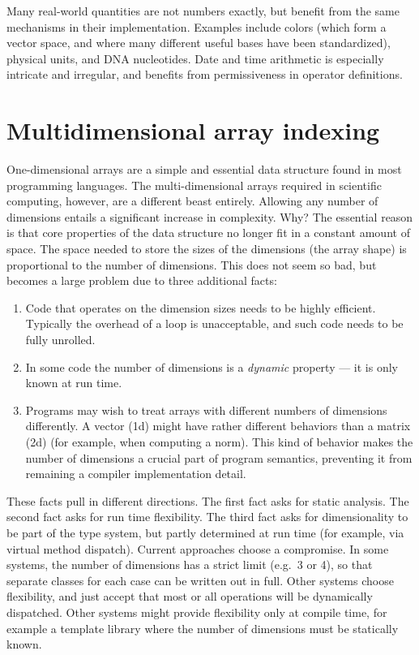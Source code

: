 Many real-world quantities are not numbers exactly, but benefit from the
same mechanisms in their implementation.
Examples include colors (which form a vector space, and where many different
useful bases have been standardized), physical units, and DNA nucleotides.
Date and time arithmetic is especially intricate and irregular, and
benefits from permissiveness in operator definitions.


\section{Multidimensional array indexing}
\label{sec:ndindexing}

One-dimensional arrays are a simple and essential data structure found in
most programming languages.
The multi-dimensional arrays required in scientific computing, however, are
a different beast entirely.
Allowing any number of dimensions entails a significant increase in complexity.
Why?
The essential reason is that core properties of the data structure no
longer fit in a constant amount of space.
The space needed to store the sizes of the dimensions (the array shape) is
proportional to the number of dimensions.
This does not seem so bad, but becomes a large problem due to three additional
facts:

\begin{enumerate}
\item Code that operates on the dimension sizes needs to be highly efficient.
Typically the overhead of a loop is unacceptable, and such code needs to be fully
unrolled.
\item In some code the number of dimensions is a \emph{dynamic} property --- it is
only known at run time.
\item Programs may wish to treat arrays with different numbers of dimensions
differently.
A vector (1d) might have rather different behaviors than a matrix (2d)
(for example, when computing a norm).
This kind of behavior makes the number of dimensions a crucial part of program
semantics, preventing it from remaining a compiler implementation detail.
\end{enumerate}

These facts pull in different directions.
The first fact asks for static analysis.
The second fact asks for run time flexibility.
The third fact asks for dimensionality to be part of the type system, but
partly determined at run time (for example, via virtual method dispatch).
Current approaches choose a compromise.
In some systems, the number of dimensions has a strict limit (e.g.\ 3 or 4),
so that separate classes for each case can be written out in full.
Other systems choose flexibility, and just accept that most
or all operations will be dynamically dispatched.
Other systems might provide flexibility only at compile time, for example a
template library where the number of dimensions must be statically known.

